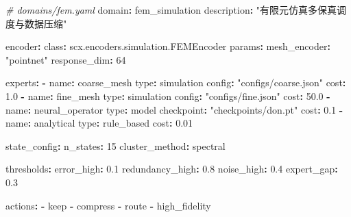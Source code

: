 \documentclass[
  12pt,
]{ctexart}
\newenvironment{Shaded}{}{}
\newcommand{\AttributeTok}[1]{\textcolor[rgb]{0.49,0.56,0.16}{#1}}
\newcommand{\CommentTok}[1]{\textcolor[rgb]{0.38,0.63,0.69}{\textit{#1}}}
\newcommand{\DecValTok}[1]{\textcolor[rgb]{0.25,0.63,0.44}{#1}}
\newcommand{\FloatTok}[1]{\textcolor[rgb]{0.25,0.63,0.44}{#1}}
\newcommand{\FunctionTok}[1]{\textcolor[rgb]{0.02,0.16,0.49}{#1}}
\newcommand{\KeywordTok}[1]{\textcolor[rgb]{0.00,0.44,0.13}{\textbf{#1}}}
\newcommand{\StringTok}[1]{\textcolor[rgb]{0.25,0.44,0.63}{#1}}
\begin{document}
\begin{Shaded}
\begin{Highlighting}[]
\CommentTok{\# domains/fem.yaml}
\FunctionTok{domain}\KeywordTok{:}\AttributeTok{ fem\_simulation}
\FunctionTok{description}\KeywordTok{:}\AttributeTok{ }\StringTok{"有限元仿真多保真调度与数据压缩"}

\FunctionTok{encoder}\KeywordTok{:}
\AttributeTok{  }\FunctionTok{class}\KeywordTok{:}\AttributeTok{ scx.encoders.simulation.FEMEncoder}
\AttributeTok{  }\FunctionTok{params}\KeywordTok{:}
\AttributeTok{    }\FunctionTok{mesh\_encoder}\KeywordTok{:}\AttributeTok{ }\StringTok{"pointnet"}
\AttributeTok{    }\FunctionTok{response\_dim}\KeywordTok{:}\AttributeTok{ }\DecValTok{64}

\FunctionTok{experts}\KeywordTok{:}
\AttributeTok{  }\KeywordTok{{-}}\AttributeTok{ }\FunctionTok{name}\KeywordTok{:}\AttributeTok{ coarse\_mesh}
\AttributeTok{    }\FunctionTok{type}\KeywordTok{:}\AttributeTok{ simulation}
\AttributeTok{    }\FunctionTok{config}\KeywordTok{:}\AttributeTok{ }\StringTok{"configs/coarse.json"}
\AttributeTok{    }\FunctionTok{cost}\KeywordTok{:}\AttributeTok{ }\FloatTok{1.0}
\AttributeTok{  }\KeywordTok{{-}}\AttributeTok{ }\FunctionTok{name}\KeywordTok{:}\AttributeTok{ fine\_mesh}
\AttributeTok{    }\FunctionTok{type}\KeywordTok{:}\AttributeTok{ simulation}
\AttributeTok{    }\FunctionTok{config}\KeywordTok{:}\AttributeTok{ }\StringTok{"configs/fine.json"}
\AttributeTok{    }\FunctionTok{cost}\KeywordTok{:}\AttributeTok{ }\FloatTok{50.0}
\AttributeTok{  }\KeywordTok{{-}}\AttributeTok{ }\FunctionTok{name}\KeywordTok{:}\AttributeTok{ neural\_operator}
\AttributeTok{    }\FunctionTok{type}\KeywordTok{:}\AttributeTok{ model}
\AttributeTok{    }\FunctionTok{checkpoint}\KeywordTok{:}\AttributeTok{ }\StringTok{"checkpoints/don.pt"}
\AttributeTok{    }\FunctionTok{cost}\KeywordTok{:}\AttributeTok{ }\FloatTok{0.1}
\AttributeTok{  }\KeywordTok{{-}}\AttributeTok{ }\FunctionTok{name}\KeywordTok{:}\AttributeTok{ analytical}
\AttributeTok{    }\FunctionTok{type}\KeywordTok{:}\AttributeTok{ rule\_based}
\AttributeTok{    }\FunctionTok{cost}\KeywordTok{:}\AttributeTok{ }\FloatTok{0.01}

\FunctionTok{state\_config}\KeywordTok{:}
\AttributeTok{  }\FunctionTok{n\_states}\KeywordTok{:}\AttributeTok{ }\DecValTok{15}
\AttributeTok{  }\FunctionTok{cluster\_method}\KeywordTok{:}\AttributeTok{ spectral}

\FunctionTok{thresholds}\KeywordTok{:}
\AttributeTok{  }\FunctionTok{error\_high}\KeywordTok{:}\AttributeTok{ }\FloatTok{0.1}
\AttributeTok{  }\FunctionTok{redundancy\_high}\KeywordTok{:}\AttributeTok{ }\FloatTok{0.8}
\AttributeTok{  }\FunctionTok{noise\_high}\KeywordTok{:}\AttributeTok{ }\FloatTok{0.4}
\AttributeTok{  }\FunctionTok{expert\_gap}\KeywordTok{:}\AttributeTok{ }\FloatTok{0.3}

\FunctionTok{actions}\KeywordTok{:}
\AttributeTok{  }\KeywordTok{{-}}\AttributeTok{ keep}
\AttributeTok{  }\KeywordTok{{-}}\AttributeTok{ compress}
\AttributeTok{  }\KeywordTok{{-}}\AttributeTok{ route}
\AttributeTok{  }\KeywordTok{{-}}\AttributeTok{ high\_fidelity}
\end{Highlighting}
\end{Shaded}
\end{document}
